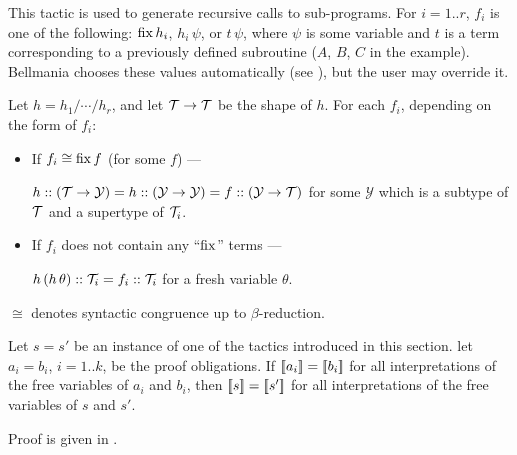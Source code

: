 This tactic is used to generate recursive calls to sub-programs. For $i=1..r$, $f_i$
is one of the following: $\operatorname{fix} h_i$, $h_i\,\psi$, or $t\,\psi$, where $\psi$ is some
variable and $t$ is a term corresponding to a previously defined subroutine
($A$, $B$, $C$ in the example).
Bellmania chooses these values automatically (see ),
but the user may override it.

\newcommand\Y{\mathcal{Y}}

\Obligations Let $h=h_1/\cdots/h_r$, and let $\mathcal{T}\to\mathcal{T}$ be the shape of $h$. 
  For each $f_i$, depending on the form of $f_i$:
\begin{itemize}
  \item If $f_i \cong \operatorname{fix} f$ (for some $f$) --- \\
    \rule{0pt}{12pt}
    $h :: (\T \to \Y) = h :: (\Y \to \Y) = f :: (\Y \to \T)$
    for some $\Y$ which is a subtype of $\mathcal{T}$ and a supertype of $\mathcal{T}_i$.
  \item If $f_i$ does not contain any ``$\operatorname{fix}$'' terms ---\\
    \rule{0pt}{12pt}
    $h\,(h\,\theta) :: \mathcal{T}_i = f_i :: \mathcal{T}_i$ for a fresh variable $\theta$.
\end{itemize}

$\cong$ denotes syntactic congruence up to $\beta$-reduction.

\bigskip
\begin{theorem}
Let $s=s'$ be an instance of one of the tactics introduced in this section.
let $a_i=b_i$, $i=1..k$, be the proof obligations. If $[\![{a_i}]\!]=[\![{b_i}]\!]$
for all interpretations of the free variables of $a_i$ and $b_i$, then
$[\![{s}]\!]=[\![{s'}]\!]$ for all interpretations of the free variables of $s$ and $s'$.
\end{theorem}

Proof is given in .


\newenvironment{tacticbox}[1]{\begin{center}
  \begin{tabular}{|@{~~~~}l@{~~~~}|}\hline
    \rule{0pt}{2.3ex}\underline{\sf \,#1\,}\\[.4em]$}
  {$\\[-1em] \\[.3ex] \hline \end{tabular} \end{center}}

\newenvironment{tacticboxInline}[1]{\begin{tabular}{|@{~~~}l@{~~~}|}\hline
    \rule{0pt}{2.3ex}\underline{\sf \,#1\,}\\[.4em]$}
  {$\\[-1em] \\[.3ex] \hline \end{tabular}}

